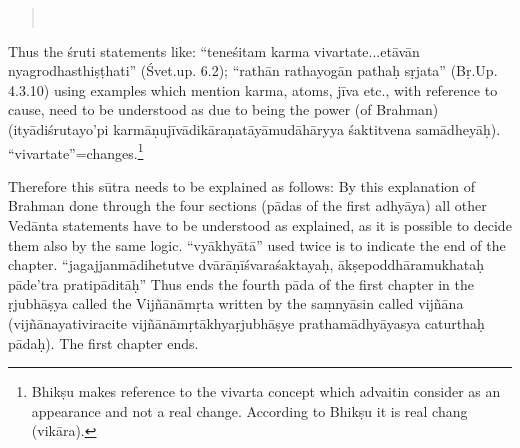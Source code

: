 \begin{verse}
\\
\end{verse}



Thus the śruti statements like: “teneśitam karma vivartate...etāvān nyagrodhasthiṣṭhati” (Śvet.up. 6.2); “rathān rathayogān pathaḥ sṛjata” (Bṛ.Up. 4.3.10) using examples which mention karma, atoms, jīva etc., with reference to cause, need to be understood as due to being the power (of Brahman) (ityādiśrutayo’pi karmāṇujīvādikāraṇatāyāmudāhāryya śaktitvena samādheyāḥ). “vivartate”=changes.\footnote{Bhikṣu makes reference to the vivarta concept which advaitin consider as an appearance and not a real change. According to Bhikṣu it is real  chang (vikāra).} 

Therefore this sūtra needs to be explained as follows: By this explanation of Brahman done through the four sections (pādas of the first adhyāya) all other Vedānta statements have to be understood as   explained, as it is possible to decide them also by the same logic. “vyā\-khyātā” used twice is to indicate the end of the chapter. “jagajjanmādihetutve dvārāṇīśvaraśaktayaḥ, ākṣepoddhāramukhataḥ pāde’tra pratipāditāḥ” Thus ends the fourth pāda of the first chapter in the ṛjubhāṣya called the Vijñānāmṛta written by the saṃnyāsin called vijñāna (vijñānayativiracite vijñānāmṛtākhyaṛjubhāṣye prathamādhyā\-yasya caturthaḥ pādaḥ). The first chapter ends.
